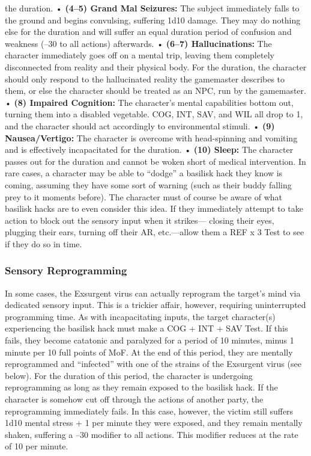 the duration.
• \textbf{(4–5) Grand Mal Seizures:} The subject immediately
falls to the ground and begins convulsing,
suffering 1d10 damage. They may do nothing 
else for the duration and will suffer an equal 
duration period of confusion and weakness (–30 
to all actions) afterwards.
•  \textbf{(6–7) Hallucinations:} The character immediately 
goes off on a mental trip, leaving them completely 
disconnected from reality and their physical body. 
For the duration, the character should only respond
to the hallucinated reality the gamemaster
describes to them, or else the character should be 
treated as an NPC, run by the gamemaster.
•  \textbf{(8) Impaired Cognition:} The character's mental 
capabilities bottom out, turning them into a 
disabled vegetable. COG, INT, SAV, and WIL all 
drop to 1, and the character should act accordingly
to environmental stimuli.
•  \textbf{(9) Nausea/Vertigo:} The character is overcome 
with head-spinning and vomiting and is effectively
incapacitated for the duration.
•  \textbf{(10) Sleep:} The character passes out for the 
duration and cannot be woken short of medical 
intervention.
In rare cases, a character may be able to ``dodge'' 
a basilisk hack they know is coming, assuming they 
have some sort of warning (such as their buddy falling
prey to it moments before). The character must of
course be aware of what basilisk hacks are to even 
consider this idea. If they immediately attempt to take 
action to block out the sensory input when it strikes—
closing their eyes, plugging their ears, turning off their 
AR, etc.—allow them a REF x 3 Test to see if they do 
so in time. 

\subsubsection{Sensory Reprogramming}

In some cases, the Exsurgent virus can actually reprogram
the target's mind via dedicated sensory input.
This is a trickier affair, however, requiring uninterrupted
programming time. As with incapacitating inputs,
the target character(s) experiencing the basilisk hack 
must make a COG + INT + SAV Test. If this fails, they 
become catatonic and paralyzed for a period of 10 
minutes, minus 1 minute per 10 full points of MoF. At 
the end of this period, they are mentally reprogrammed 
and ``infected'' with one of the strains of the Exsurgent 
virus (see below). For the duration of this period, the 
character is undergoing reprogramming as long as they 
remain exposed to the basilisk hack. If the character is 
somehow cut off through the actions of another party, 
the reprogramming immediately fails. In this case, 
however, the victim still suffers 1d10 mental stress 
+ 1 per minute they were exposed, and they remain 
mentally shaken, suffering a –30 modifier to all actions. 
This modifier reduces at the rate of 10 per minute.

